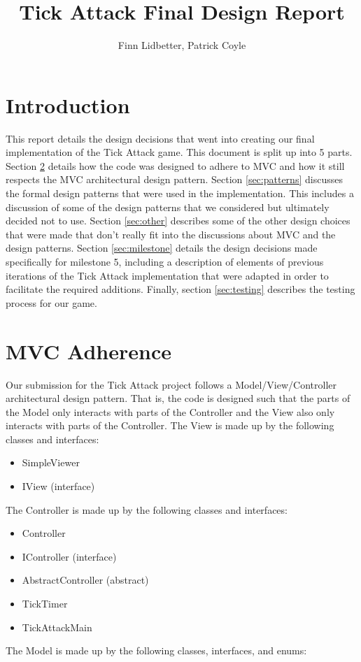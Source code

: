 \documentclass[letter paper, 12pt]{article}
\begin{document}
\title{Tick Attack Final Design Report}
\author{Finn Lidbetter, Patrick Coyle}
\maketitle

\section{Introduction}
This report details the design decisions that went into creating our final implementation of the Tick Attack game. This document is split up into 5 parts. Section \ref{sec:MVC} details how the code was designed to adhere to MVC and how it still respects the MVC architectural design pattern. Section \ref{sec:patterns} discusses the formal design patterns that were used in the implementation. This includes a discussion of some of the design patterns that we considered but ultimately decided not to use. Section \ref{sec:other} describes some of the other design choices that were made that don't really fit into the discussions about MVC and the design patterns. Section \ref{sec:milestone} details the design decisions made specifically for milestone 5, including a description of elements of previous iterations of the Tick Attack implementation that were adapted in order to facilitate the required additions. Finally, section \ref{sec:testing} describes the testing process for our game.

\section{MVC Adherence}\label{sec:MVC}
Our submission for the Tick Attack project follows a Model/View/Controller architectural design pattern. That is, the code is designed such that the parts of the Model only interacts with parts of the Controller and the View also only interacts with parts of the Controller. 
The View is made up by the following classes and interfaces: 
\begin{itemize}
	\item SimpleViewer
	\item IView (interface)
\end{itemize} 
The Controller is made up by the following classes and interfaces:
\begin{itemize}
	\item Controller
	\item IController (interface)
	\item AbstractController (abstract)
	\item TickTimer
	\item TickAttackMain
\end{itemize}
The Model is made up by the following classes, interfaces, and enums:
\end{document}
